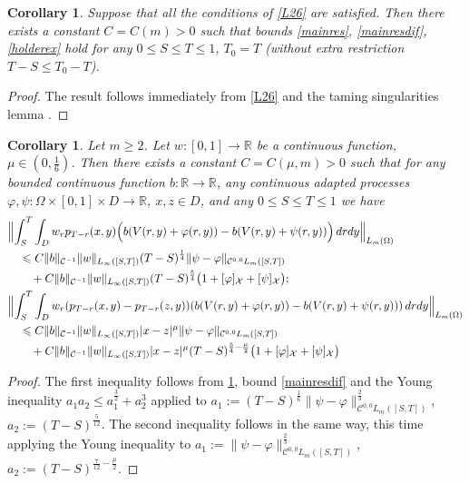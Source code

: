 \documentclass[12pt]{article}
\newtheorem{corollary}[theorem]{Corollary}
\theoremstyle{definition}
\DeclareMathOperator{\1}{\mathbbm{1}}%
\def\phi{\varphi}
\renewcommand{\ge}{\geqslant}
\renewcommand{\le}{\leqslant}
\newcommand{\nn}{\nonumber}
\newcommand{\C}{\mathcal{C}}
\newcommand{\R}{\mathbb{R}}
\newcommand{\X}{\mathcal{X}}
\begin{document}
\begin{corollary}\label{c:39}
Suppose that all the conditions of \cref{L26} are satisfied. Then there exists a constant $C=C(m)>0$ such that bounds \eqref{mainres}, \eqref{mainresdif}, \eqref{holderex} hold for any $0\le S\le T\le 1$, $T_0=T$ (without extra restriction $T-S\le T_0-T$). 
\end{corollary}
\begin{proof}
The result follows immediately from \cref{L26} and the taming singularities lemma \cite[Lemma~2.3]{BFG}.
\end{proof}

\begin{corollary}\label{c:310}
Let $m\ge2$. Let $w\colon[0,1]\to\R$ be a continuous function, $\mu\in(0,\frac16)$. 
Then there exists a constant $C=C(\mu,m)>0$ such that for any bounded continuous function $b\colon\R\to\R$, any continuous adapted processes  $\phi,\psi\colon\Omega\times[0,1]\times D\to\R$, $x,z\in D$, and any $0\le S\le T\le 1$ we have 
\begin{align}%
&\Bigl\|\int_S^T \int_D w_r p_{T-r}(x,y)\Bigl(b( V(r,y)+\phi(r,y))- b( V(r,y)+\psi(r,y))\Bigr)\,dr dy\Bigr\|_{L_m(\Omega)}\nn\\
&\quad\le  C \|b\|_{\C^{-1}}\|w\|_{L_\infty([S,T])} (T-S)^{\frac14}\|\psi-\phi\|_{\C^{0,0}L_m([S,T])}\nn\\
&\qquad+ C \|b\|_{\C^{-1}}\|w\|_{L_\infty([S,T])}(T-S)^{\frac54}\bigl(1+[\phi]_{\X}+[\psi]_{\X}\bigr);\\
&\Bigl\|\int_S^T \int_D  w_r(p_{T-r}(x,y)-p_{T-r}(z,y)) (b( V(r,y)+\phi(r,y))-b( V(r,y)+\psi(r,y)))\,dr dy\Bigr\|_{L_m(\Omega)}\nn\\
&\quad\le  C \|b\|_{\C^{-1}}\|w\|_{L_\infty([S,T])} |x-z|^\mu \|\psi-\phi\|_{\C^{0,0}L_m([S,T])}\nn\\
&\qquad+ C \|b\|_{\C^{-1}} \|w\|_{L_\infty([S,T])} |x-z|^\mu (T-S)^{\frac{5}4-\frac\mu2}\bigl(1+[\phi]_{\X}+[\psi]_{\X}\bigr) \nn
 \end{align}
\end{corollary}
\begin{proof}
The first inequality follows from  \cref{c:39}, bound \eqref{mainresdif} and the Young inequality ${a_1 a_2\le  a_1^{\frac32} + a_2^3}$ applied to $a_1:=(T-S)^{\frac1{6}}\|\psi-\phi\|_{\C^{0,0}L_m([S,T])}^{\frac23}$, $a_2:=(T-S)^{\frac5{12}}$. 
The second inequality follows in the same way, this time applying the Young inequality to $a_1:=\|\psi-\phi\|_{\C^{0,0}L_m([S,T])}^{\frac23}$, $a_2:=(T-S)^{\frac7{12}-\frac\mu2}$. 
\end{proof}
\end{document}
